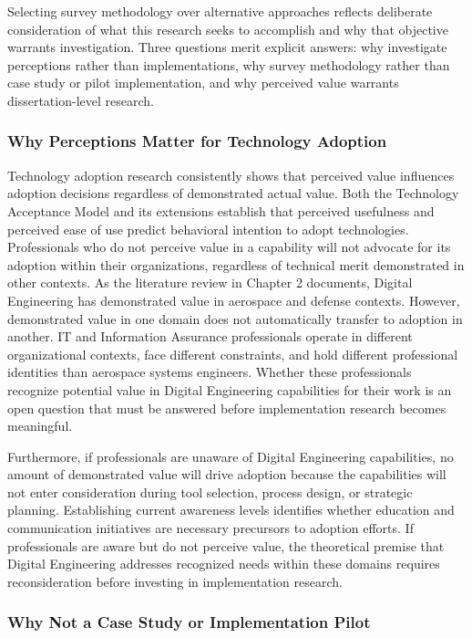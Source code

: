 Selecting survey methodology over alternative approaches reflects deliberate consideration of what this research seeks to accomplish and why that objective warrants investigation. Three questions merit explicit answers: why investigate perceptions rather than implementations, why survey methodology rather than case study or pilot implementation, and why perceived value warrants dissertation-level research.

\subsubsection{Why Perceptions Matter for Technology Adoption}

Technology adoption research consistently shows that perceived value influences adoption decisions regardless of demonstrated actual value. Both the Technology Acceptance Model and its extensions establish that perceived usefulness and perceived ease of use predict behavioral intention to adopt technologies. Professionals who do not perceive value in a capability will not advocate for its adoption within their organizations, regardless of technical merit demonstrated in other contexts. As the literature review in Chapter 2 documents, Digital Engineering has demonstrated value in aerospace and defense contexts. However, demonstrated value in one domain does not automatically transfer to adoption in another. IT and Information Assurance professionals operate in different organizational contexts, face different constraints, and hold different professional identities than aerospace systems engineers. Whether these professionals recognize potential value in Digital Engineering capabilities for their work is an open question that must be answered before implementation research becomes meaningful.

Furthermore, if professionals are unaware of Digital Engineering capabilities, no amount of demonstrated value will drive adoption because the capabilities will not enter consideration during tool selection, process design, or strategic planning. Establishing current awareness levels identifies whether education and communication initiatives are necessary precursors to adoption efforts. If professionals are aware but do not perceive value, the theoretical premise that Digital Engineering addresses recognized needs within these domains requires reconsideration before investing in implementation research.

\subsubsection{Why Not a Case Study or Implementation Pilot}

